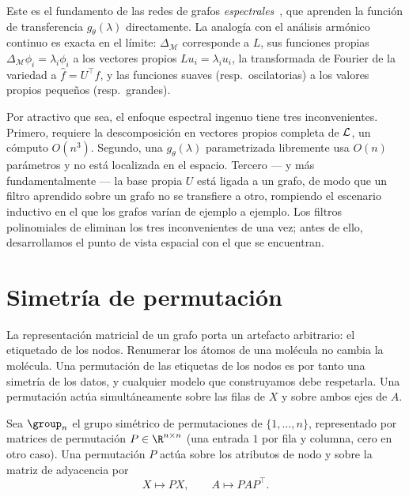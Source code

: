Este es el fundamento de las redes de grafos \emph{espectrales}~\citep%
{bruna2014spectralnetworkslocallyconnected}, que aprenden la funci\'on de
transferencia $g_\theta(\lambda)$ directamente. La analog\'ia con el an\'alisis
arm\'onico continuo es exacta en el l\'imite: $\Delta_{\mathcal{M}}$ corresponde a
$L$, sus funciones propias $\Delta_{\mathcal{M}}\phi_i = \lambda_i \phi_i$ a los
vectores propios $L u_i = \lambda_i u_i$, la transformada de Fourier de la
variedad a $\hat f = U^\top f$, y las funciones suaves (resp.\ oscilatorias) a los
valores propios peque\~nos (resp.\ grandes).

Por atractivo que sea, el enfoque espectral ingenuo tiene tres inconvenientes.
Primero, requiere la descomposici\'on en vectores propios completa de $\mathcal{L}$, un
c\'omputo $O(n^3)$. Segundo, una $g_\theta(\lambda)$ parametrizada libremente usa
$O(n)$ par\'ametros y no est\'a localizada en el espacio. Tercero --- y m\'as
fundamentalmente --- la base propia $U$ est\'a ligada a un grafo, de modo que un
filtro aprendido sobre un grafo no se transfiere a otro, rompiendo el escenario
inductivo en el que los grafos var\'ian de ejemplo a ejemplo. Los filtros
polinomiales de  eliminan los tres inconvenientes de una
vez; antes de ello, desarrollamos el punto de vista espacial con el que se
encuentran.

\section{Simetr\'ia de permutaci\'on}
\label{sec:graphs:permutation}

La representaci\'on matricial de un grafo porta un artefacto arbitrario: el
etiquetado de los nodos. Renumerar los \'atomos de una mol\'ecula no cambia la
mol\'ecula. Una permutaci\'on de las etiquetas de los nodos es por tanto una
simetr\'ia de los datos, y cualquier modelo que construyamos debe respetarla. Una
permutaci\'on act\'ua simult\'aneamente sobre las filas de $X$ y sobre ambos ejes
de $A$.

\begin{definition}
\label{def:graphs:permutation-action}
Sea $\group_n$ el grupo sim\'etrico de permutaciones de $\{1, \dots, n\}$,
representado por matrices de permutaci\'on $P \in \R^{n \times n}$ (una entrada
$1$ por fila y columna, cero en otro caso). Una permutaci\'on $P$ act\'ua sobre
los atributos de nodo y sobre la matriz de adyacencia por
\[
  X \mapsto P X, \qquad A \mapsto P A P^\top .
\]
\end{definition}

